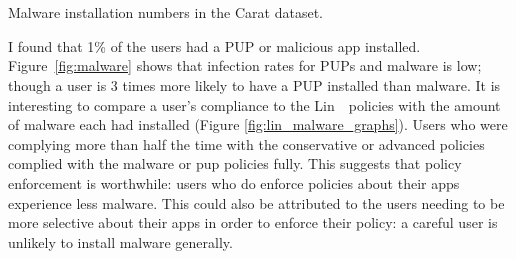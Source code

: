 \documentclass[thesis.tex]{subfiles}
\begin{document}
\begin{marginfigure}
  \centering
  \\
  \\
  \caption{Malware installation numbers in the Carat dataset.}
  \label{fig:malware}
\end{marginfigure}
I found that 1\% of the users had a \ac{PUP} or malicious app installed.
Figure~\ref{fig:malware} shows that infection rates for \acp{PUP} and malware is low;
though a user is 3 times more likely to have a \ac{PUP} installed than malware.
It is interesting to compare a user's compliance to the Lin~\etal~policies with the amount of malware each had installed (Figure \autoref{fig:lin_malware_graphs}).
Users who were complying more than half the time with the conservative or advanced policies complied with the malware or \ac{pup} policies fully.
This suggests that policy enforcement is worthwhile: users who do enforce policies about their apps experience less malware.
This could also be attributed to the users needing to be more selective about their apps in order to enforce their policy: a careful user is unlikely to install malware generally.
\end{document}
